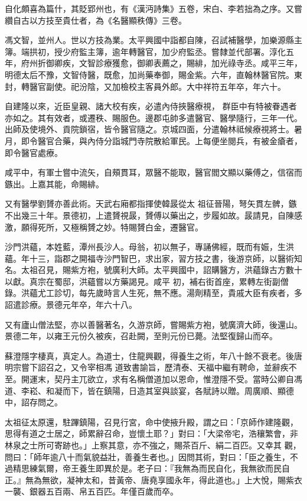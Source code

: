 \begin{pinyinscope}
 自化頗喜為篇什，其貶郢州也，有《漢沔詩集》五卷，宋白、李若拙為之序。又嘗纘自古以方技至貴仕者，為《名醫顯秩傳》三卷。



 馮文智，並州人。世以方技為業。太平興國中詣都自陳，召試補醫學，加樂源縣主簿。端拱初，授少府監主簿，逾年轉醫官，加少府監丞。嘗隸並代部署。淳化五年，府州折御卿疾，文智診療獲愈，御卿表薦之，賜緋，加光祿寺丞。咸平三年，明德太后不豫，文智侍醫，既愈，加尚藥奉御，賜金紫。六年，直翰林醫官院。東封，轉醫官副使。祀汾陰，又加檢校主客員外郎。大中祥符五年卒，年六十。



 自建隆以來，近臣皇親、諸大校有疾，必遣內侍挾醫療視，
 群臣中有特被眷遇者亦如之。其有效者，或遷秩、賜服色。邊郡屯帥多遣醫官、醫學隨行，三年一代。出師及使境外、貢院鎖宿，皆令醫官隨之。京城四面，分遣翰林祗候療視將士。暑月，即令醫官合藥，與內侍分詣城門寺院散給軍民。上每便坐閱兵，有被金瘡者，即令醫官處療。



 咸平中，有軍士嘗中流矢，自頰貫耳，眾醫不能取，醫官閻文顯以藥傅之，信宿而鏃出。上嘉其能，命賜緋。



 又有醫學劉贇亦善此術。天武右廂都指揮使韓晸從太
 祖征晉陽，弩矢貫左髀，鏃不出幾三十年。景德初，上遣贇視晸，贇傅以藥出之，步履如故。晸請見，自陳感激，願得死所，又極稱贇之妙。特賜贇白金，遷醫官。



 沙門洪蘊，本姓藍，潭州長沙人。母翁，初以無子，專誦佛經，既而有娠，生洪蘊。年十三，詣郡之開福寺沙門智巴，求出家，習方技之書，後游京師，以醫術知名。太祖召見，賜紫方袍，號廣利大師。太平興國中，詔購醫方，洪蘊錄古方數十以獻。真宗在蜀邸，洪蘊嘗以方藥謁見。咸平
 初，補右街首座，累轉左街副僧錄。洪蘊尤工診切，每先歲時言人生死，無不應。湯劑精至，貴戚大臣有疾者，多詔遣診療。景德元年卒，年六十八。



 又有廬山僧法堅，亦以善醫著名，久游京師，嘗賜紫方袍，號廣濟大師，後還山。景德二年，以雍王元份久被疾，召赴闕，至則元份已薨。法堅復歸山而卒。



 蘇澄隱字棲真，真定人。為道士，住龍興觀，得養生之術，年八十餘不衰老。後唐明宗嘗下詔召之，又令宰相馮
 道致書諭旨，歷清泰、天福中繼有聘命，並辭疾不至。開運末，契丹主兀欲立，求有名稱僧道加以恩命，惟澄隱不受。當時公卿自馮道、李崧、和凝而下，皆在鎮陽，日造其室與談宴，各賦詩以贈。周廣順、顯德中，詔存問之。



 太祖征太原還，駐蹕鎮陽，召見行宮，命中使掖升殿，謂之曰：「京師作建隆觀，思得有道之士居之，師累辭召命，豈懷土耶？」對曰：「大梁帝宅，浩穰繁會，非林泉之士所可寄跡也。」上察其意，亦不強之，賜茶百斤、絹二百匹。又幸其
 觀，問曰：「師年逾八十而氣貌益壯，善養生者也。」因問其術，對曰：「臣之養生，不過精思練氣爾，帝王養生即異於是。老子曰：『我無為而民自化，我無欲而民自正。』無為無欲，凝神太和，昔黃帝、唐堯享國永年，得此道也。」上大悅，賜紫衣一襲、銀器五百兩、帛五百匹。年僅百歲而卒。




\end{pinyinscope}
